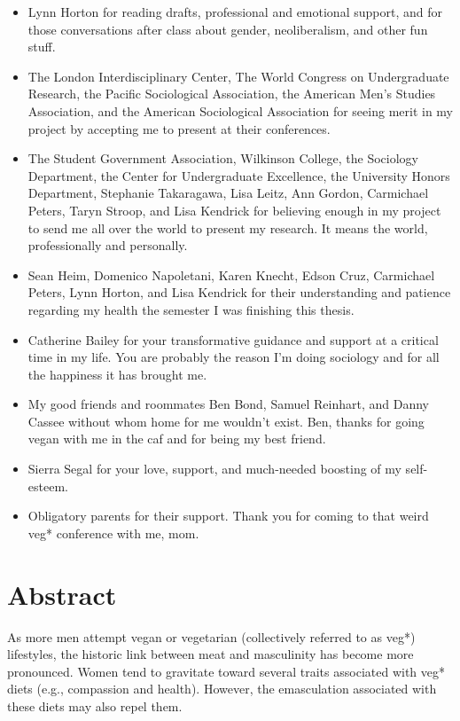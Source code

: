 \documentclass[twoside]{report}
\let\oldsection\section
\renewcommand\section{\clearpage\oldsection}
\begin{document}
\begin{itemize}
 \item
       Lynn Horton for reading drafts, professional and emotional support,
       and for those conversations after class about gender, neoliberalism,
       and other fun stuff.
 \item
       The London Interdisciplinary Center, The World Congress on
       Undergraduate Research, the Pacific Sociological Association, the
       American Men's Studies Association, and the American Sociological
       Association for seeing merit in my project by accepting me to present
       at their conferences.
 \item
       The Student Government Association, Wilkinson College, the Sociology
       Department, the Center for Undergraduate Excellence, the University
       Honors Department, Stephanie Takaragawa, Lisa Leitz, Ann Gordon,
       Carmichael Peters, Taryn Stroop, and Lisa Kendrick for believing
       enough in my project to send me all over the world to present my
       research. It means the world, professionally and personally.
 \item
       Sean Heim, Domenico Napoletani, Karen Knecht, Edson Cruz, Carmichael
       Peters, Lynn Horton, and Lisa Kendrick for their understanding and
       patience regarding my health the semester I was finishing this thesis.
 \item
       Catherine Bailey for your transformative guidance and support at a
       critical time in my life. You are probably the reason I'm doing
       sociology and for all the happiness it has brought me.
 \item
       My good friends and roommates Ben Bond, Samuel Reinhart, and Danny
       Cassee without whom home for me wouldn't exist. Ben, thanks for going
       vegan with me in the caf and for being my best friend.
 \item
       Sierra Segal for your love, support, and much-needed boosting of my
       self-esteem.
 \item
       Obligatory parents for their support. Thank you for coming to that
       weird veg* conference with me, mom.
\end{itemize}

\section{Abstract}

As more men attempt vegan or vegetarian (collectively referred to as veg*) lifestyles, the historic link between meat and masculinity has become more pronounced. Women tend to gravitate toward several traits associated with veg* diets (e.g., compassion and health). However, the emasculation associated with these diets may also repel them.
\end{document}
